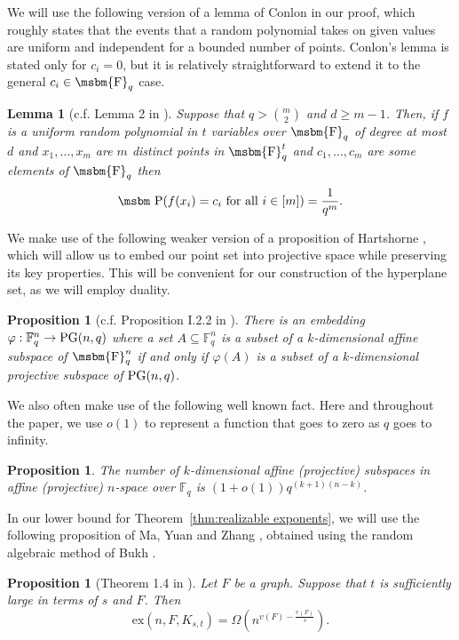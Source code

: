 \documentclass[12pt]{article}
\newtheorem{proposition}[theorem]{Proposition}
\newtheorem{lemma}[theorem]{Lemma}
\newcommand{\ex}{\mathrm{ex}}
\newcommand{\FF}{\mbox{\msbm{F}}}
\newcommand{\PP}{\mbox{\msbm P}}
\begin{document}
 We will use the following version of a lemma of Conlon \cite{conlon2019graphs} in our proof, which roughly states that the events that a random polynomial takes on given values are uniform and independent for a bounded number of points. Conlon's lemma is stated only for $c_i = 0$, but it is relatively straightforward to extend it to the general $c_i \in \FF_q$ case. 
\begin{lemma}[c.f. Lemma 2 in \cite{conlon2019graphs}]\label{conlon-nonzero}
Suppose that $q > \binom{m}{2}$ and $d \geq m - 1$. Then, if $f$ is a uniform random polynomial in $t$ variables over $\FF_q$ of degree at most $d$ and $x_1, \dots, x_m$ are $m$ distinct points in $\FF_q^t$ and $c_1, \dots, c_m$ are some elements of $\FF_q$ then 
$$\PP(f(x_i) = c_i \text{ for all } i \in [m]) = \frac{1}{q^m}. $$
\end{lemma}

We make use of the following weaker version of a proposition of Hartshorne \cite{hartshorne},
which will allow us to embed our point set into projective space while preserving its key properties. This will be convenient for our construction of the hyperplane set, as we will employ duality. 
\begin{proposition}[c.f. Proposition I.2.2 in \cite{hartshorne}]\label{affinetoprojective}
    There is an embedding $\varphi:\mathbb{F}_q^n \rightarrow {\rm{PG}}(n, q)$ where a set $A\subseteq \mathbb{F}_q^n$ is a subset of 
    a $k$-dimensional affine subspace of $\FF_q^n$ if and only if $\varphi(A)$ is a subset of a $k$-dimensional projective subspace of ${\rm{PG}}(n,q)$. 
\end{proposition}
We also often make use of the following well known fact. Here and throughout the paper, we use $o(1)$ to represent a function that goes to zero as $q$ goes to infinity. 
\begin{proposition} \label{prop:subspace count}
    The number of $k$-dimensional affine (projective) subspaces in affine (projective) $n$-space over $\mathbb{F}_q$ is $(1 +o(1))q^{(k + 1)(n - k)}$.
\end{proposition}

In our lower bound for Theorem~\ref{thm:realizable exponents}, we will use the following proposition of Ma, Yuan and Zhang \cite{ma2018some}, obtained using the random algebraic method of Bukh \cite{bukh2015random}. 

\begin{proposition}[Theorem 1.4 in \cite{ma2018some}] \label{prop:realizable lower bound}
Let $F$ be a graph. Suppose that $t$ is sufficiently large in terms of $s$ and $F$. Then 
$$\ex(n, F, K_{s, t}) = \Omega(n^{v(F) - \frac{e(F)}{s}}).$$
\end{proposition}
\end{document}
